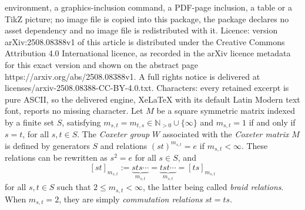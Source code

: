 \documentclass[10pt,a4paper]{amsart}
\begin{document}
environment, a graphics-inclusion command, a PDF-page inclusion, a table or a TikZ picture; no image file is copied into this package, the package declares no asset dependency and no image file is redistributed with it. Licence: version arXiv:2508.08388v1 of this article is distributed under the Creative Commons Attribution 4.0 International licence, as recorded in the arXiv licence metadata for this exact version and shown on the abstract page https://arxiv.org/abs/2508.08388v1. A full rights notice is delivered at licenses/arxiv-2508.08388-CC-BY-4.0.txt. Characters: every retained excerpt is pure ASCII, so the delivered engine, XeLaTeX with its default Latin Modern text font, reports no missing character.
Let $M$ be a square symmetric matrix indexed by a finite set $S$, satisfying  $m_{s,t}=m_{t,s}\in \mathbb{N}_{>0}\cup \{\infty\}$ and $m_{s,t}=1$ if and only if $s=t$, for all $s,t\in S$. The \textit{Coxeter group} $W$ associated with the \textit{Coxeter matrix} $M$ is defined by generators $S$ and relations $(st)^{m_{s,t}}=e$ if $m_{s,t}< \infty$. These relations can be rewritten as $s^2=e$ for all $s\in S$, and \begin{equation}\label{eq:mst}    
[st]_{m_{s,t}}:=\underbrace{sts\cdots}_{m_{s,t}}=\underbrace{tst\cdots}_{m_{s,t}}=[ts]_{m_{s,t}}\end{equation} for all $s,t\in S$ such that $2\le m_{s,t}< \infty$, the latter being called \textit{braid relations}. When $m_{s,t}=2$, they are simply \textit{commutation relations} $st=ts$. 
\end{document}
